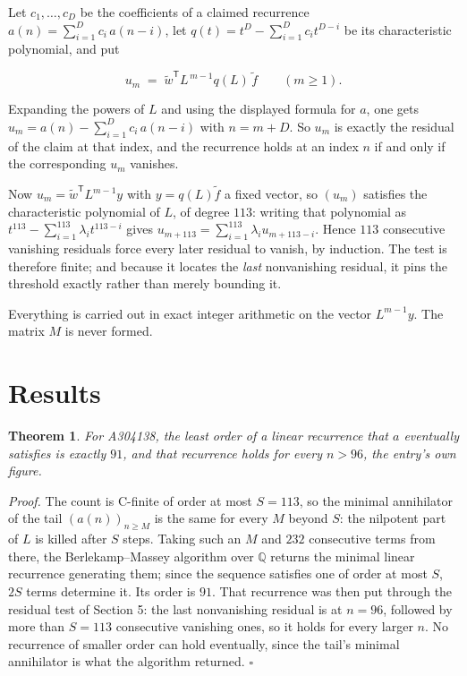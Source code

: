 \documentclass[11pt]{article}
\newtheorem{theorem}{Theorem}
\theoremstyle{definition}
\begin{document}
Let $c_1,\dots,c_D$ be the coefficients of a claimed recurrence $a(n) = \sum_{i=1}^{D} c_i\,a(n-i)$, let $q(t) = t^{D} - \sum_{i=1}^{D} c_i t^{D-i}$ be its characteristic polynomial, and put

\[u_m \;=\; \tilde w^{\mathsf T} L^{\,m-1} q(L)\,\tilde f \qquad (m \ge 1).\]

Expanding the powers of $L$ and using the displayed formula for $a$, one gets $u_m = a(n) - \sum_{i=1}^{D} c_i\,a(n-i)$ with $n = m + D$. So $u_m$ is exactly the residual of the claim at that index, and the recurrence holds at an index $n$ if and only if the corresponding $u_m$ vanishes.

Now $u_m = \tilde w^{\mathsf T} L^{m-1} y$ with $y = q(L)\tilde f$ a fixed vector, so $(u_m)$ satisfies the characteristic polynomial of $L$, of degree $113$: writing that polynomial as $t^{113} - \sum_{i=1}^{113} \lambda_i t^{113-i}$ gives $u_{m+113} = \sum_{i=1}^{113} \lambda_i u_{m+113-i}$. Hence $113$ consecutive vanishing residuals force every later residual to vanish, by induction. The test is therefore finite; and because it locates the {\itshape last} nonvanishing residual, it pins the threshold exactly rather than merely bounding it.

Everything is carried out in exact integer arithmetic on the vector $L^{m-1}y$. The matrix $M$ is never formed.

\section{Results}

\begin{theorem} For A304138, the least order of a linear recurrence that $a$ eventually satisfies is exactly $91$, and that recurrence holds for every $n > 96$, the entry's own figure.\end{theorem}

{\itshape Proof.} The count is C-finite of order at most $S = 113$, so the minimal annihilator of the tail $(a(n))_{n \ge M}$ is the same for every $M$ beyond $S$: the nilpotent part of $L$ is killed after $S$ steps. Taking such an $M$ and $232$ consecutive terms from there, the Berlekamp--Massey algorithm over $\mathbb{Q}$ returns the minimal linear recurrence generating them; since the sequence satisfies one of order at most $S$, $2S$ terms determine it. Its order is $91$. That recurrence was then put through the residual test of Section 5: the last nonvanishing residual is at $n = 96$, followed by more than $S = 113$ consecutive vanishing ones, so it holds for every larger $n$. No recurrence of smaller order can hold eventually, since the tail's minimal annihilator is what the algorithm returned. $\square$
\end{document}
